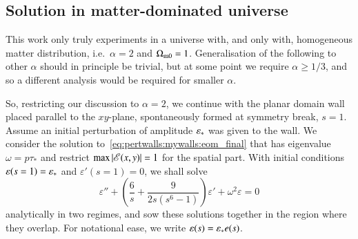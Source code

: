 \subsection{Solution in matter-dominated universe}
    This work only truly experiments in a universe with, and only with, homogeneous matter distribution, i.e.~$\alpha=2$ and $\Omega_\mathrm{m0}=1$. Generalisation of the following to other $\alpha$ should in principle be trivial, but at some point we require $\alpha\geq 1/3$, and so a different analysis would be required for smaller $\alpha$.

    So, restricting our discussion to $\alpha=2$, we continue with the planar domain wall placed parallel to the $xy$-plane, spontaneously formed at symmetry break, $s=1$. Assume an initial perturbation of amplitude $\varepsilon_\ast$ was given to the wall. We consider the solution to~\cref{eq:pertwalls:mywalls:eom_final} that has eigenvalue $\omega=p\tau_\ast$ and restrict $\max{\abs{\mathscr{E}(x,y)}}=1$ for the spatial part.
    With initial conditions $\varepsilon(s=1)=\varepsilon_\ast$ and $\varepsilon'(s=1)=0$, we shall solve
    \begin{equation}\label{eq:pertwalls:mywalls:eom_eps_s_MD}
        \varepsilon'' + \left( \frac{6}{s}  +\frac{9}{2s\left(s^6-1\right)} \right) \varepsilon' + \omega^2 \varepsilon = 0
    \end{equation}
    analytically in two regimes, and sow these solutions together in the region where they overlap. For notational ease, we write $\varepsilon(s) = \varepsilon_\ast e(s)$.
    

